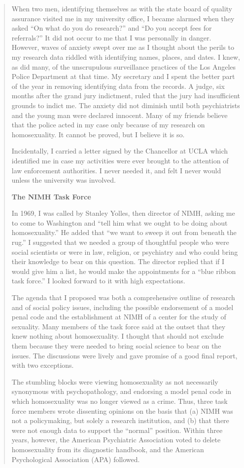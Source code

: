 \begin{refsection}
\begin{quote}
When two men, identifying themselves as with the state board of quality assurance visited me in my university office, I became alarmed when they asked ``On what do you do research?'' and ``Do you accept fees for referrals?'' It did not occur to me that I was personally in danger. However, waves of anxiety swept over me as I thought about the perils to my research data riddled with identifying names, places, and dates. I knew, as did many, of the unscrupulous surveillance practices of the Los Angeles Police Department at that time. My secretary and I spent the better part of the year in removing identifying data from the records. A judge, six months after the grand jury indictment, ruled that the jury had insufficient grounds to indict me. The anxiety did not diminish until both psychiatrists and the young man were declared innocent. Many of my friends believe that the police acted in my case only because of my research on homosexuality. It cannot be proved, but I believe it is so.

Incidentally, I carried a letter signed by the Chancellor at UCLA which identified me in case my activities were ever brought to the attention of law enforcement authorities. I never needed it, and felt I never would unless the university was involved.

\textbf{The NIMH Task Force} 

In 1969, I was called by Stanley Yolles, then director of NIMH, asking me to come to Washington and ``tell him what we ought to be doing about homosexuality.'' He added that ``we want to sweep it out from beneath the rug.'' I suggested that we needed a group of thoughtful people who were social scientists or were in law, religion, or psychiatry and who could bring their knowledge to bear on this question. The director replied that if I would give him a list, he would make the appointments for a ``blue ribbon task force.'' I looked forward to it with high expectations.

The agenda that I proposed was both a comprehensive outline of research and of social policy issues, including the possible endorsement of a model penal code and the establishment at NIMH of a center for the study of sexuality. Many members of the task force said at the outset that they knew nothing about homosexuality. I thought that should not exclude them because they were needed to bring social science to bear on the issues. The discussions were lively and gave promise of a good final report, with two exceptions.

The stumbling blocks were viewing homosexuality as not necessarily synonymous with psychopathology, and endorsing a model penal code in which homosexuality was no longer viewed as a crime. Thus, three task force members wrote dissenting opinions on the basis that (a) NIMH was not a policymaking, but solely a research institution, and (b) that there were not enough data to support the ``normal'' position. Within three years, however, the American Psychiatric Association voted to delete homosexuality from its diagnostic handbook, and the American Psychological Association (APA) followed.


\end{quote}
\end{refsection}
